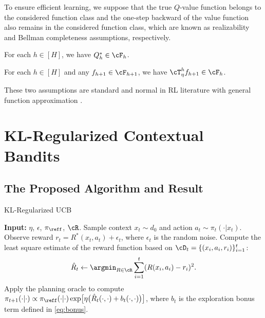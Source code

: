 \documentclass[11pt]{article}
\begin{document}
To ensure efficient learning, we suppose that the true $Q$-value function belongs to the considered function class and the one-step backward of the value function also remains in the considered function class, which are known as realizability and Bellman completeness assumptions, respectively.
\begin{assumption}[Realizability]\label{as:Realizability}
    For each $h\in[H]$, we have $Q_h^*\in\cF_h$.
\end{assumption}
\begin{assumption}\label{as:Bellman completeness}
For each $h\in[H]$ and any $f_{h+1}\in\cF_{h+1}$, we have $\cT_\eta^h f_{h+1} \in \cF_h$.
\end{assumption}
These two assumptions are standard and normal in RL literature with general function approximation \citep{wang2020reinforcement, jin2021bellman, zhang2023mathematical}. 

\section{KL-Regularized Contextual Bandits} \label{sec:kl_bandit}

\subsection{The Proposed Algorithm and Result}

\begin{algorithm}[ht]
    \caption{KL-Regularized UCB}
    \label{alg:kl-bandits}
    \begin{algorithmic}[1]
    \STATE \textbf{Input:} $\eta$, $\epsilon$, $\pi_{\reff}$, $\cR$.
        \STATE Sample context $x_t \sim d_0$ and action $a_t \sim \pi_t(\cdot|x_t)$.
        \STATE Observe reward $r_t = R^*(x_t, a_t) + \epsilon_t$, where $\epsilon_t$ is the random noise. 
        \STATE Compute the least square estimate of the reward function based on $\cD_t=\{(x_i, a_i, r_i)\}_{i=1}^t$:
        $$\hat{R}_{t} \gets \argmin_{R \in \cR}\sum_{i=1}^t (R(x_i, a_i) - r_i)^2.
        $$ 
        \STATE Apply the planning oracle to compute $\pi_{t + 1}(\cdot | \cdot) \propto \pi_{\reff}(\cdot | \cdot) \exp\bigl[\eta \big(\hat R_t(\cdot, \cdot) + b_t(\cdot, \cdot)\big)\bigr]$, \label{alg1:line:policy}
        where $b_t$ is the exploration bonus term defined in \eqref{eq:bonus}.
    \ENDFOR
    \end{algorithmic}
\end{algorithm}
\end{document}
